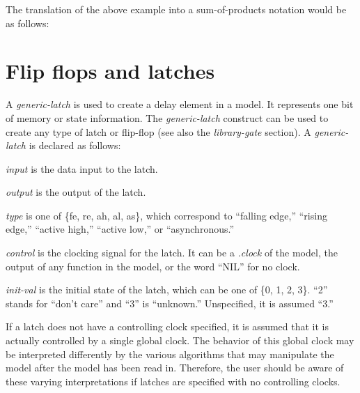 {\begin{pespace}
The translation of the above example into a sum-of-products
notation would be as follows:

\section{Flip flops and latches}

A {\em generic-latch} is used to create a delay element in a
model.  It represents one bit of memory or state information.  The {\em
generic-latch} construct can be used to create any type of latch or
flip-flop (see also the {\em library-gate} section).  A {\em generic-latch}
is declared as follows:


\begin{description}
\item {\em input} is the data input to the latch.

\item {\em output} is the output of the latch.

\item {\em type} is one of \{fe, re, ah, al, as\}, which correspond to
``falling edge,'' ``rising edge,'' ``active high,'' ``active low,'' or
``asynchronous.''  

\item {\em control} is the clocking signal for the latch.  It can be a {\em
.clock} of the model, the output of any function in the model, or the word
``NIL'' for no clock.

\item {\em init-val} is the initial state of the latch, which can be one of
\{0, 1, 2, 3\}.  ``2'' stands for ``don't care'' and ``3'' is ``unknown.''
Unspecified, it is assumed ``3.''
\end{description}

If a latch does not have a controlling clock specified, it is assumed that
it is actually controlled by a single global clock.  The behavior of this
global clock may be interpreted differently by the various algorithms that
may manipulate the model after the model has been read in.  Therefore, the
user should be aware of these varying interpretations if latches are
specified with no controlling clocks.


\end{pespace}}
